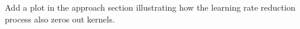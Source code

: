 Add a plot in the approach section illustrating how the learning rate reduction process also zeros out kernels.